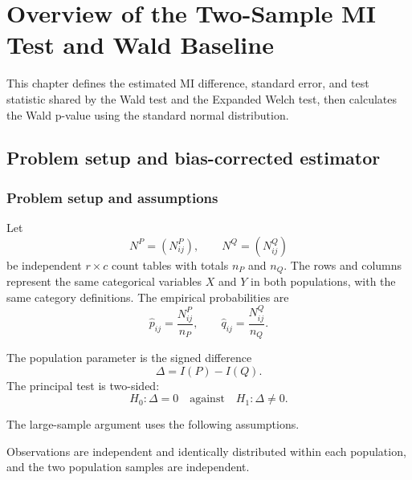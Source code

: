 \chapter{Overview of the Two-Sample MI Test and Wald Baseline}
\label{chap:baselines}

This chapter defines the estimated MI difference, standard error, and test
statistic shared by the Wald test and the Expanded Welch test, then calculates the
Wald p-value using the standard normal distribution.

\section{Problem setup and bias-corrected estimator}

\subsection{Problem setup and assumptions}

Let
\begin{equation}
  N^P=(N^P_{ij}),
  \qquad
  N^Q=(N^Q_{ij})
\end{equation}
be independent \(r\times c\) count tables with totals \(n_P\) and \(n_Q\).
The rows and columns represent the same categorical variables \(X\) and
\(Y\) in both populations, with the same category definitions.
The empirical probabilities are
\begin{equation}
  \widehat p_{ij}=\frac{N^P_{ij}}{n_P},
  \qquad
  \widehat q_{ij}=\frac{N^Q_{ij}}{n_Q}.
\end{equation}

The population parameter is the signed difference
\begin{equation}
  \Delta=I(P)-I(Q).
  \label{eq:delta-population}
\end{equation}
The principal test is two-sided:
\begin{equation}
  H_0:\Delta=0
  \quad\text{against}\quad
  H_1:\Delta\ne0.
  \label{eq:two-sample-null}
\end{equation}

The large-sample argument uses the following assumptions.

\begin{samepage}
\begin{assumption}[Sampling]
Observations are independent and identically distributed within each
population, and the two population samples are independent.
\end{assumption}
\end{samepage}

